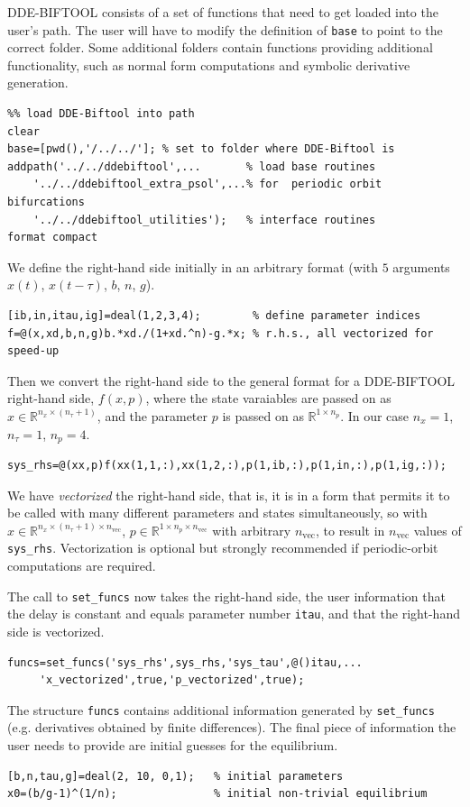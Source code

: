\documentclass[10pt]{scrartcl}
\newcommand{\DDEBIFCODE}{\textsc{DDE-BIFTOOL}}
\newcommand{\RR}{\mathbb{R}}
\newcommand{\blist}[1]{\mbox{\lstinline!#1!}}
\begin{document}
{\DDEBIFCODE} consists of a set of functions that need to get loaded
into the user's path. The user will have to modify the definition of
\blist{base} to point to the correct folder. Some additional folders
contain functions providing additional functionality, such as normal
form computations and symbolic derivative generation.
\begin{lstlisting}
%% load DDE-Biftool into path
clear
base=[pwd(),'/../../']; % set to folder where DDE-Biftool is
addpath('../../ddebiftool',...       % load base routines
    '../../ddebiftool_extra_psol',...% for  periodic orbit bifurcations
    '../../ddebiftool_utilities');   % interface routines
format compact
\end{lstlisting}
We define the right-hand side initially in an arbitrary format (with
$5$ arguments $x(t)$, $x(t-\tau)$, $b$, $n$, $g$).
\begin{lstlisting}
[ib,in,itau,ig]=deal(1,2,3,4);        % define parameter indices
f=@(x,xd,b,n,g)b.*xd./(1+xd.^n)-g.*x; % r.h.s., all vectorized for speed-up  
\end{lstlisting}
Then we convert the right-hand side to the general format for a
{\DDEBIFCODE} right-hand side, $f(x,p)$, where the state varaiables
are passed on as $x\in\RR^{n_x\times (n_\tau+1)}$, and the parameter
$p$ is passed on as $\RR^{1\times n_p}$. In our case $n_x=1$,
$n_\tau=1$, $n_p=4$.
\begin{lstlisting}
sys_rhs=@(xx,p)f(xx(1,1,:),xx(1,2,:),p(1,ib,:),p(1,in,:),p(1,ig,:));
\end{lstlisting}
We have \emph{vectorized} the right-hand side, that is, it is in a
form that permits it to be called with many different parameters and
states simultaneously, so with
$x\in\RR^{n_x\times(n_\tau+1)\times n_\mathrm{vec}}$,
$p\in \RR^{1\times n_p\times n_\mathrm{vec}}$ with arbitrary
$n_\mathrm{vec}$, to result in $n_\mathrm{vec}$ values of
\blist{sys_rhs}. Vectorization is optional but strongly recommended if
periodic-orbit computations are required.

The call to \blist{set_funcs} now takes the right-hand side, the user information that the delay is constant and equals parameter number \blist{itau}, and that the right-hand side is vectorized.
\begin{lstlisting}
funcs=set_funcs('sys_rhs',sys_rhs,'sys_tau',@()itau,...
     'x_vectorized',true,'p_vectorized',true);
\end{lstlisting}
The structure \blist{funcs} contains additional information 
generated by \blist{set_funcs} (e.g. derivatives obtained by finite differences).
The final piece of information the user needs to provide are initial guesses for the equilibrium.
\begin{lstlisting}
[b,n,tau,g]=deal(2, 10, 0,1);   % initial parameters
x0=(b/g-1)^(1/n);               % initial non-trivial equilibrium  
\end{lstlisting}
\end{document}

